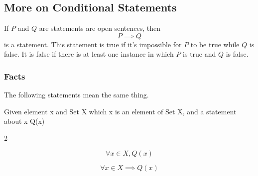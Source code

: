 \subsection{More on Conditional Statements}
\begin{definition}
    If $P$ and $Q$ are statements are open sentences, then 
    \[
        P \implies Q
    \]
    is a statement. This statement is true if it's impossible for $P$ to be true while $Q$ is false. 
    It is false if there is at least one instance in which $P$ is true and $Q$ is false. 
\end{definition}

\subsubsection*{Facts}
The following statements mean the same thing.

Given element x and Set X which x is an element of Set X, and a statement about x Q(x)
\begin{paracol}{2}
    \begin{leftcolumn}
        \[
        \forall x \in X, Q(x)
        \]
    \end{leftcolumn}
    \begin{rightcolumn}
        \[
        \forall x \in X \implies Q(x)
        \]
    \end{rightcolumn}
\end{paracol}
\newpage
